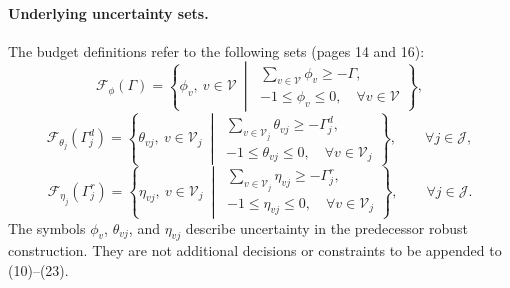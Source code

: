 \documentclass{article}
\begin{document}
\paragraph{Underlying uncertainty sets.}
The budget definitions refer to the following sets (pages 14 and 16):
\[
\mathcal F_{\phi}(\Gamma)=
\left\{\phi_v,\ v\in\mathcal V\ \middle|\
\begin{array}{l}
\displaystyle\sum_{v\in\mathcal V}\phi_v\geq-\Gamma,\\
-1\leq\phi_v\leq0,\quad\forall v\in\mathcal V
\end{array}\right\},
\]
\[
\mathcal F_{\theta_j}(\Gamma^d_j)=
\left\{\theta_{vj},\ v\in\mathcal V_j\ \middle|\
\begin{array}{l}
\displaystyle\sum_{v\in\mathcal V_j}\theta_{vj}\geq-\Gamma^d_j,\\
-1\leq\theta_{vj}\leq0,\quad\forall v\in\mathcal V_j
\end{array}\right\},\qquad\forall j\in\mathcal J,
\]
\[
\mathcal F_{\eta_j}(\Gamma^r_j)=
\left\{\eta_{vj},\ v\in\mathcal V_j\ \middle|\
\begin{array}{l}
\displaystyle\sum_{v\in\mathcal V_j}\eta_{vj}\geq-\Gamma^r_j,\\
-1\leq\eta_{vj}\leq0,\quad\forall v\in\mathcal V_j
\end{array}\right\},\qquad\forall j\in\mathcal J.
\]
The symbols $\phi_v$, $\theta_{vj}$, and $\eta_{vj}$ describe uncertainty in the predecessor robust construction. They are not additional decisions or constraints to be appended to (10)--(23).
\end{document}
